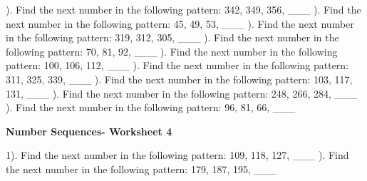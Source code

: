 \documentclass{article}%
\begin{document}
). Find the next number in the following pattern: 342, 349, 356, \_\_\_%
\newline%
\newline%
). Find the next number in the following pattern: 45, 49, 53, \_\_\_%
\newline%
\newline%
). Find the next number in the following pattern: 319, 312, 305, \_\_\_%
\newline%
\newline%
). Find the next number in the following pattern: 70, 81, 92, \_\_\_%
\newline%
\newline%
). Find the next number in the following pattern: 100, 106, 112, \_\_\_%
\newline%
\newline%
). Find the next number in the following pattern: 311, 325, 339, \_\_\_%
\newline%
\newline%
). Find the next number in the following pattern: 103, 117, 131, \_\_\_%
\newline%
\newline%
). Find the next number in the following pattern: 248, 266, 284, \_\_\_%
\newline%
\newline%
). Find the next number in the following pattern: 96, 81, 66, \_\_\_%
\newline%
\newline%
\newline%
\pagebreak%
\large%
\begin{center}%
\textbf{Number Sequences- Worksheet 4}%
\newline%
\end{center} \normalsize%
1). Find the next number in the following pattern: 109, 118, 127, \_\_\_%
\newline%
\newline%
). Find the next number in the following pattern: 179, 187, 195, \_\_\_%
\newline%
\end{document}
